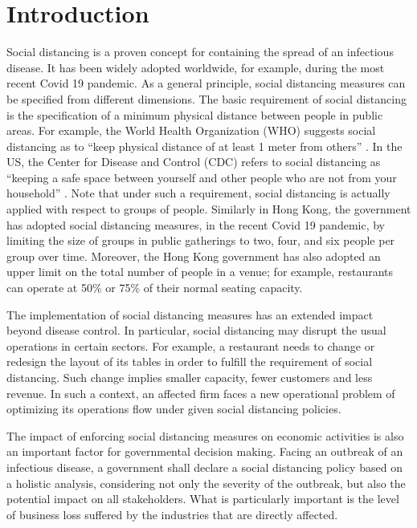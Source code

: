 \section{Introduction}
Social distancing is a proven concept for containing the spread of an infectious disease. It has been widely adopted worldwide, for example, during the most recent Covid 19 pandemic. As a general principle, social distancing measures can be specified from different dimensions. The basic requirement of social distancing is the specification of a minimum physical distance between people in public areas. For example, the World Health Organization (WHO) suggests social distancing as to ``keep physical distance of at least 1 meter from others'' \cite{AdviceforPublic}. In the US, the Center for Disease and Control (CDC) refers to social distancing as ``keeping a safe space between yourself and other people who are not from your household'' \cite{CDC}.
Note that under such a requirement, social distancing is actually applied with respect to groups of people. Similarly in Hong Kong, the government has adopted social distancing measures, in the recent Covid 19 pandemic, by limiting the size of groups in public gatherings to two, four, and six people per group over time. Moreover, the Hong Kong government has also adopted an upper limit on the total number of people in a venue; for example, restaurants can operate at 50\% or 75\% of their normal seating capacity.


The implementation of social distancing measures has an extended impact beyond disease control. In particular, social distancing may disrupt the usual operations in certain sectors. For example, a restaurant needs to change or redesign the layout of its tables in order to fulfill the requirement of social distancing. Such change implies smaller capacity, fewer customers and less revenue. In such a context, an affected firm faces a new operational problem of optimizing its operations flow under given social distancing policies.

The impact of enforcing social distancing measures on economic activities is also an important factor for governmental decision making. Facing an outbreak of an infectious disease, a government shall declare a social distancing policy based on a holistic analysis, considering not only the severity of the outbreak, but also the potential impact on all stakeholders. What is particularly important is the level of business loss suffered by the industries that are directly affected.  
 

